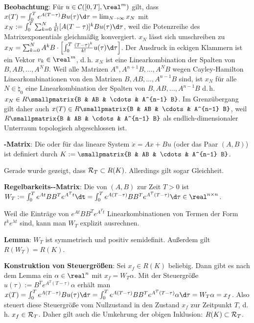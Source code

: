 \linie

\textbf{Beobachtung}:
Für $u \in \C([0, T], \real^m)$ gilt, dass
$x(T) = \int_0^T e^{A(T-\tau)} B u(\tau) \d\tau = \lim_{N \to \infty} x_N$
mit $x_N := \int_0^T \sum_{k=0}^N \frac{1}{k!} [A(T - \tau)]^k Bu(\tau)\d\tau$,
weil die Potenzreihe des Matrixexponentials gleichmäßig konvergiert.
$x_N$ lässt sich umschreiben zu
$x_N = \sum_{k=0}^N A^k B \cdot \left[\int_0^T \frac{(T - \tau)^k}{k!} u(\tau)\d\tau\right]$.
Der Ausdruck in eckigen Klammern ist ein Vektor $v_k \in \real^m$,
d.\,h. $x_N$ ist eine Linearkombination der Spalten von $B, AB, \dotsc, A^N B$.
Weil alle Matrizen $A^n, A^{n+1} B, \dotsc, A^N B$ wegen Cayley-Hamilton
Linearkombinationen von den Matrizen $B, AB, \dotsc, A^{n-1} B$ sind,
ist $x_N$ für alle $N \in \natural_0$ eine Linearkombination der Spalten
von $B, AB, \dotsc, A^{n-1} B$
d.\,h. $x_N \in R\smallpmatrix{B & AB & \cdots & A^{n-1} B}$.
Im Grenzübergang gilt daher auch $x(T) \in R\smallpmatrix{B & AB & \cdots & A^{n-1} B}$,
weil $R\smallpmatrix{B & AB & \cdots & A^{n-1} B}$ als endlich-dimensionaler Unterraum
topologisch abgeschlossen ist.

\textbf{-Matrix}:
Die  oder 
für das lineare System
$\dot{x} = Ax + Bu$ (oder das Paar $(A, B)$) ist definiert durch
$K := \smallpmatrix{B & AB & \cdots & A^{n-1} B}$.

Gerade wurde gezeigt, dass $\mathcal{R}_T \subset R(K)$.
Allerdings gilt sogar Gleichheit.

\linie
\pagebreak

\textbf{Regelbarkeits--Matrix}:
Die  von $(A, B)$
zur Zeit $T > 0$ ist
$W_T := \int_0^T e^{At} BB^T e^{A^Tt}\dt =
\int_0^T e^{A(T-\tau)} BB^T e^{A^T(T-\tau)}\d\tau \in \real^{n \times n}$.

Weil die Einträge von $e^{At} BB^T e^{A^Tt}$ Linearkombinationen von Termen der Form
$t^k e^{\lambda t}$ sind, kann man $W_T$ explizit ausrechnen.

\textbf{Lemma}:
$W_T$ ist symmetrisch und positiv semidefinit.
Außerdem gilt $R(W_T) = R(K)$.

\textbf{Konstruktion von Steuergrößen}:
Sei $x_f \in R(K)$ beliebig.
Dann gibt es nach dem Lemma ein $\alpha \in \real^n$ mit $x_f = W_T \alpha$.
Mit der Steuergröße $u(\tau) := B^T e^{A^T (T - \tau)} \alpha$ erhält man\\
$x(T) = \int_0^T e^{A(T - \tau)} Bu(\tau) \d\tau
= \int_0^T e^{A(T - \tau)} B B^T e^{A^T (T - \tau)} \alpha \d\tau
= W_T \alpha = x_f$.
Also steuert diese Steuergröße vom Nullzustand in den Zustand $x_f$ zur Zeitpunkt $T$,
d.\,h. $x_f \in \mathcal{R}_T$.
Daher gilt auch die Umkehrung der obigen Inklusion: $R(K) \subset \mathcal{R}_T$.


